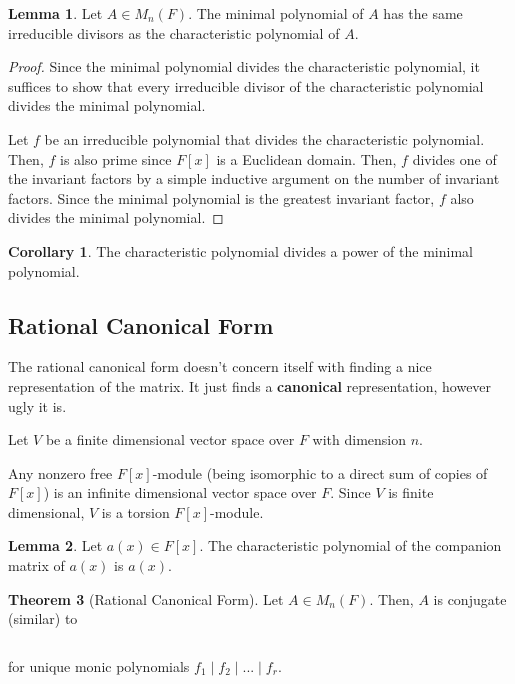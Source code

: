 \documentclass{article}
\theoremstyle{definition}
\newtheorem{theorem}{Theorem}[section]
\newtheorem{lemma}[theorem]{Lemma}
\newtheorem{corollary}{Corollary}[theorem]
\begin{document}
\begin{lemma}
    Let $A \in M_{n}(F)$. The minimal polynomial of $A$ has the same irreducible divisors
    as the characteristic polynomial of $A$.
\end{lemma}
\begin{proof}
    Since the minimal polynomial divides the characteristic polynomial, it suffices to show
    that every irreducible divisor of the characteristic polynomial divides the minimal polynomial.

    Let $f $ be an irreducible polynomial that divides the characteristic polynomial. Then, $f$ is
    also prime since $F[x]$ is a Euclidean domain. Then, $f$ divides one of the invariant factors by
    a simple inductive argument on the number of invariant factors. Since the minimal polynomial is
    the greatest invariant factor, $f$ also divides the minimal polynomial.
\end{proof}

\begin{corollary}
    The characteristic polynomial divides a power of the minimal polynomial.
\end{corollary}

\subsection{Rational Canonical Form}

The rational canonical form doesn't concern itself with finding a nice representation of the matrix.
It just finds a \textbf{canonical} representation, however ugly it is.

Let $V$ be a finite dimensional vector space over $F$ with dimension $n$. 

Any nonzero free $F[x]$-module (being isomorphic to a direct sum of copies of $F[x]$)
is an infinite dimensional vector space over $F$. Since $V$ is finite dimensional,
$V$ is a torsion $F[x]$-module.

\begin{lemma}
    Let $a(x) \in F[x]$. The characteristic polynomial of the companion matrix of $a(x)$ is $a(x)$.
\end{lemma}




\begin{theorem}[Rational Canonical Form]
    Let $A \in M_{n}(F)$. Then, $A$ is conjugate (similar) to 

    \[ \]

    for unique monic polynomials $f_{1} \mid f_{2} \mid ... \mid f_{r}$.
\end{theorem}
\end{document}
